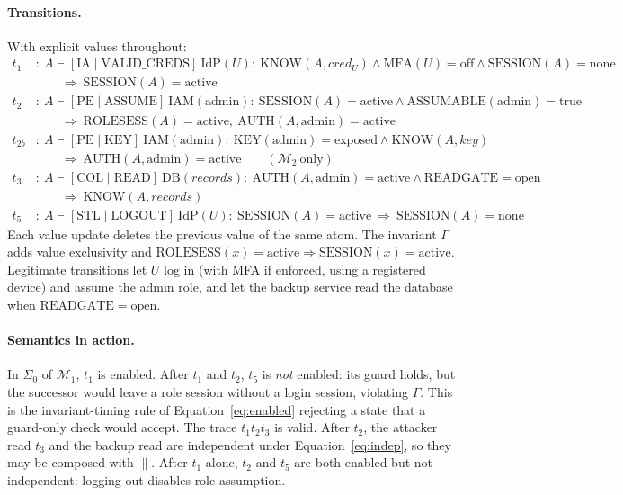 \documentclass[11pt,letterpaper]{article}
\theoremstyle{definition}
\newcommand{\St}{\Sigma}
\newcommand{\Inv}{\Gamma}
\newcommand{\Mod}{\mathcal{M}}
\begin{document}
\paragraph{Transitions.} With explicit values throughout:
{\small
\begin{align*}
t_1&:\ A\vdash[\mathrm{IA}\mid\mathrm{VALID\_CREDS}]\ \mathrm{IdP}(U):\ \mathrm{KNOW}(A,\mathit{cred}_U)\wedge\mathrm{MFA}(U)=\mathrm{off}\wedge\mathrm{SESSION}(A)=\mathrm{none}\\
&\qquad\Rightarrow\ \mathrm{SESSION}(A)=\mathrm{active}\\
t_2&:\ A\vdash[\mathrm{PE}\mid\mathrm{ASSUME}]\ \mathrm{IAM}(\mathrm{admin}):\ \mathrm{SESSION}(A)=\mathrm{active}\wedge\mathrm{ASSUMABLE}(\mathrm{admin})=\mathrm{true}\\
&\qquad\Rightarrow\ \mathrm{ROLESESS}(A)=\mathrm{active},\ \mathrm{AUTH}(A,\mathrm{admin})=\mathrm{active}\\
t_{2b}&:\ A\vdash[\mathrm{PE}\mid\mathrm{KEY}]\ \mathrm{IAM}(\mathrm{admin}):\ \mathrm{KEY}(\mathrm{admin})=\mathrm{exposed}\wedge\mathrm{KNOW}(A,\mathit{key})\\
&\qquad\Rightarrow\ \mathrm{AUTH}(A,\mathrm{admin})=\mathrm{active}\qquad(\Mod_2\ \text{only})\\
t_3&:\ A\vdash[\mathrm{COL}\mid\mathrm{READ}]\ \mathrm{DB}(\mathit{records}):\ \mathrm{AUTH}(A,\mathrm{admin})=\mathrm{active}\wedge\mathrm{READGATE}=\mathrm{open}\\
&\qquad\Rightarrow\ \mathrm{KNOW}(A,\mathit{records})\\
t_5&:\ A\vdash[\mathrm{STL}\mid\mathrm{LOGOUT}]\ \mathrm{IdP}(U):\ \mathrm{SESSION}(A)=\mathrm{active}\ \Rightarrow\ \mathrm{SESSION}(A)=\mathrm{none}
\end{align*}}
Each value update deletes the previous value of the same atom. The invariant $\Inv$ adds value exclusivity and $\mathrm{ROLESESS}(x)=\mathrm{active}\Rightarrow\mathrm{SESSION}(x)=\mathrm{active}$. Legitimate transitions let $U$ log in (with MFA if enforced, using a registered device) and assume the admin role, and let the backup service read the database when $\mathrm{READGATE}=\mathrm{open}$.

\paragraph{Semantics in action.} In $\St_0$ of $\Mod_1$, $t_1$ is enabled. After $t_1$ and $t_2$, $t_5$ is \emph{not} enabled: its guard holds, but the successor would leave a role session without a login session, violating $\Inv$. This is the invariant-timing rule of Equation~\eqref{eq:enabled} rejecting a state that a guard-only check would accept. The trace $t_1t_2t_3$ is valid. After $t_2$, the attacker read $t_3$ and the backup read are independent under Equation~\eqref{eq:indep}, so they may be composed with $\parallel$. After $t_1$ alone, $t_2$ and $t_5$ are both enabled but not independent: logging out disables role assumption.
\end{document}
